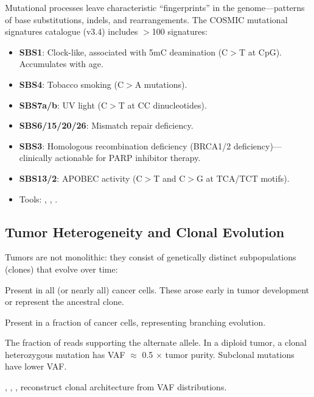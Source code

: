 Mutational processes leave characteristic ``fingerprints'' in the genome---patterns of base substitutions, indels, and rearrangements. The COSMIC mutational signatures catalogue (v3.4) includes $>$100 signatures:

\begin{itemize}[nosep]
  \item \textbf{SBS1}: Clock-like, associated with 5mC deamination (C$>$T at CpG). Accumulates with age.
  \item \textbf{SBS4}: Tobacco smoking (C$>$A mutations).
  \item \textbf{SBS7a/b}: UV light (C$>$T at CC dinucleotides).
  \item \textbf{SBS6/15/20/26}: Mismatch repair deficiency.
  \item \textbf{SBS3}: Homologous recombination deficiency (BRCA1/2 deficiency)---clinically actionable for PARP inhibitor therapy.
  \item \textbf{SBS13/2}: APOBEC activity (C$>$T and C$>$G at TCA/TCT motifs).
  \item Tools: , , .
\end{itemize}

\subsection{Tumor Heterogeneity and Clonal Evolution}

Tumors are not monolithic: they consist of genetically distinct subpopulations (clones) that evolve over time:

\begin{description}[style=nextline]
  \item[Clonal mutations] Present in all (or nearly all) cancer cells. These arose early in tumor development or represent the ancestral clone.
  \item[Subclonal mutations] Present in a fraction of cancer cells, representing branching evolution.
  \item[Variant allele frequency (VAF)] The fraction of reads supporting the alternate allele. In a diploid tumor, a clonal heterozygous mutation has VAF $\approx$ 0.5 $\times$ tumor purity. Subclonal mutations have lower VAF.
  \item[Tools] , , ,  reconstruct clonal architecture from VAF distributions.
\end{description}

